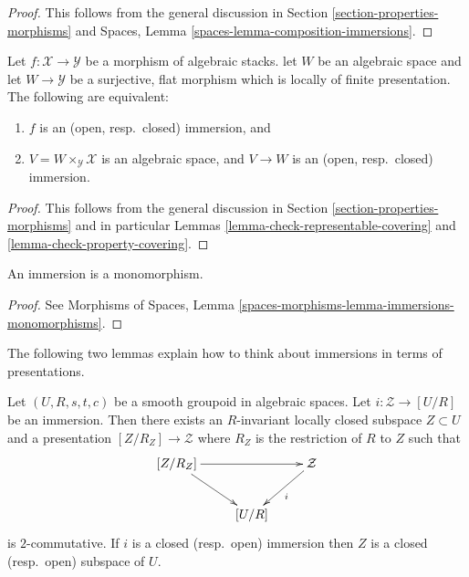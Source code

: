 \begin{proof}
This follows from the general discussion in
Section \ref{section-properties-morphisms}
and
Spaces, Lemma \ref{spaces-lemma-composition-immersions}.
\end{proof}

\begin{lemma}
\label{lemma-check-immersion-covering}
Let $f : \mathcal{X} \to \mathcal{Y}$ be a morphism of algebraic stacks.
let $W$ be an algebraic space and let $W \to \mathcal{Y}$ be a surjective,
flat morphism which is locally of finite presentation. The following
are equivalent:
\begin{enumerate}
\item $f$ is an (open, resp.\ closed) immersion, and
\item $V = W \times_{\mathcal{Y}} \mathcal{X}$ is an algebraic space, and
$V \to W$ is an (open, resp.\ closed) immersion.
\end{enumerate}
\end{lemma}

\begin{proof}
This follows from the general discussion in
Section \ref{section-properties-morphisms}
and in particular
Lemmas \ref{lemma-check-representable-covering} and
\ref{lemma-check-property-covering}.
\end{proof}

\begin{lemma}
\label{lemma-immersion-monomorphism}
An immersion is a monomorphism.
\end{lemma}

\begin{proof}
See
Morphisms of Spaces,
Lemma \ref{spaces-morphisms-lemma-immersions-monomorphisms}.
\end{proof}

\noindent
The following two lemmas explain how to think about
immersions in terms of presentations.

\begin{lemma}
\label{lemma-immersion-into-presentation}
Let $(U, R, s, t, c)$ be a smooth groupoid in algebraic spaces.
Let $i : \mathcal{Z} \to [U/R]$ be an immersion.
Then there exists an $R$-invariant locally closed subspace
$Z \subset U$ and a presentation $[Z/R_Z] \to \mathcal{Z}$
where $R_Z$ is the restriction of $R$ to $Z$ such that
$$
\xymatrix{
[Z/R_Z] \ar[dr] \ar[rr] & & \mathcal{Z} \ar[ld]^i \\
& [U/R]
}
$$
is $2$-commutative. If $i$ is a closed (resp.\ open) immersion
then $Z$ is a closed (resp.\ open) subspace of $U$.
\end{lemma}

